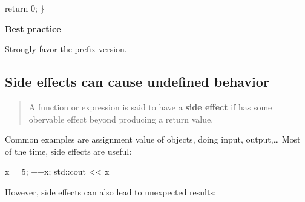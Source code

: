 \documentclass[
  letterpaper,
  DIV=11,
  numbers=noendperiod]{scrreprt}
\newenvironment{Shaded}{\begin{snugshade}}{\end{snugshade}}
\newcommand{\DecValTok}[1]{\textcolor[rgb]{0.68,0.00,0.00}{#1}}
\newcommand{\ErrorTok}[1]{\textcolor[rgb]{0.68,0.00,0.00}{#1}}
\newcommand{\NormalTok}[1]{\textcolor[rgb]{0.00,0.23,0.31}{#1}}
\newcommand{\OtherTok}[1]{\textcolor[rgb]{0.00,0.23,0.31}{#1}}
\newcommand{\SpecialCharTok}[1]{\textcolor[rgb]{0.37,0.37,0.37}{#1}}
\begin{document}
\begin{Shaded}
\begin{Highlighting}[]
\NormalTok{    return }\DecValTok{0}\NormalTok{;}
\NormalTok{\}}
\end{Highlighting}
\end{Shaded}

\begin{tcolorbox}[enhanced jigsaw, toprule=.15mm, rightrule=.15mm, opacityback=0, breakable, leftrule=.75mm, colback=white, colframe=quarto-callout-tip-color-frame, arc=.35mm, left=2mm, bottomrule=.15mm]
\begin{minipage}[t]{5.5mm}
\textcolor{quarto-callout-tip-color}{\faLightbulb}
\end{minipage}%
\begin{minipage}[t]{\textwidth - 5.5mm}

\textbf{Best practice}\vspace{2mm}

Strongly favor the prefix version.

\end{minipage}%
\end{tcolorbox}

\hypertarget{side-effects-can-cause-undefined-behavior}{%
\subsection{Side effects can cause undefined
behavior}\label{side-effects-can-cause-undefined-behavior}}

\begin{quote}
A function or expression is said to have a \textbf{side effect} if has
some obervable effect beyond producing a return value.
\end{quote}

Common examples are assignment value of objects, doing input,
output,\ldots{} Most of the time, side effects are useful:

\begin{Shaded}
\begin{Highlighting}[]
\NormalTok{x }\OtherTok{=} \DecValTok{5}\NormalTok{;}
\SpecialCharTok{++}\NormalTok{x;}
\NormalTok{std}\SpecialCharTok{::}\NormalTok{cout }\SpecialCharTok{\textless{}}\ErrorTok{\textless{}}\NormalTok{ x}
\end{Highlighting}
\end{Shaded}

However, side effects can also lead to unexpected results:
\end{document}
